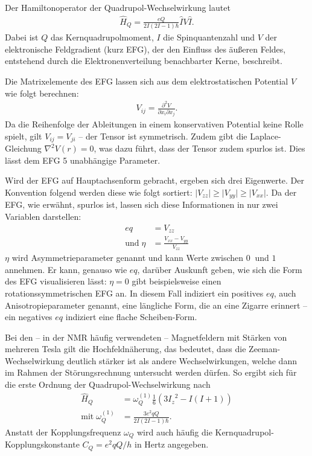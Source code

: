Der Hamiltonoperator der Quadrupol-Wechselwirkung lautet \cite[S. 208]{levitt}
\begin{align}
	\hat{H}_Q = \frac{eQ}{2I (2I - 1) \hbar} \hat{I} V \hat{I}.
\end{align}
Dabei ist $Q$ das Kernquadrupolmoment, $I$ die Spinquantenzahl und $V$ der elektronische Feldgradient (kurz EFG), der den Einfluss des äußeren Feldes, entstehend durch die Elektronenverteilung benachbarter Kerne, beschreibt.

Die Matrixelemente des EFG lassen sich aus dem elektrostatischen Potential $V$ wie folgt berechnen:
\begin{align}
	V_{ij} = \frac{\partial^2 V}{\partial x_i \partial x_j}.
\end{align}
Da die Reihenfolge der Ableitungen in einem konservativen Potential keine Rolle spielt, gilt $V_{ij} = V_{ji}$ -- der Tensor ist symmetrisch. Zudem gibt die Laplace-Gleichung $\nabla^2 V(r) = 0$, was dazu führt, dass der Tensor zudem spurlos ist. Dies lässt dem EFG 5 unabhängige Parameter.

Wird der EFG auf Hauptachsenform gebracht, ergeben sich drei Eigenwerte. Der Konvention folgend werden diese wie folgt sortiert: $\lvert V_{zz} \rvert \ge \lvert V_{yy} \rvert \ge \lvert V_{xx} \rvert$. Da der EFG, wie erwähnt, spurlos ist, lassen sich diese Informationen in nur zwei Variablen darstellen:
\begin{align}
	eq                & = V_{zz}                         \\
	\text{und}\; \eta & = \frac{V_{xx} - V_{yy}}{V_{zz}}
\end{align}
$\eta$ wird Asymmetrieparameter genannt und kann Werte zwischen $\SI{0}{}$ und $\SI{1}{}$ annehmen. Er kann, genauso wie $eq$, darüber Auskunft geben, wie sich die Form des EFG visualisieren lässt: $\eta = 0$ gibt beispielsweise einen rotationssymmetrischen EFG an. In diesem Fall indiziert ein positives $eq$, auch Anisotropieparameter genannt, eine längliche Form, die an eine Zigarre erinnert -- ein negatives $eq$ indiziert eine flache Scheiben-Form.

Bei den -- in der NMR häufig verwendeten -- Magnetfeldern mit Stärken von mehreren Tesla gilt die Hochfeldnäherung, das bedeutet, dass die Zeeman-Wechselwirkung deutlich stärker ist als andere Wechselwirkungen, welche dann im Rahmen der Störungsrechnung untersucht werden dürfen. So ergibt sich für die erste Ordnung der Quadrupol-Wechselwirkung nach \cite[S. 209]{levitt}
\begin{align}
	\hat{H}_Q                   & = \omega_Q^{(1)} \frac{1}{6} \left( 3 {I_z}^2 - I(I + 1) \right) \\
	\text{mit}\; \omega_Q^{(1)} & = \frac{3e^2qQ}{2I(2I - 1) \hbar}.
\end{align}
Anstatt der Kopplungsfrequenz $\omega_Q$ wird auch häufig die Kern\-quad\-ru\-pol-Kopp\-lungs\-kon\-stan\-te $C_Q = e^2qQ / h$ in Hertz angegeben.

